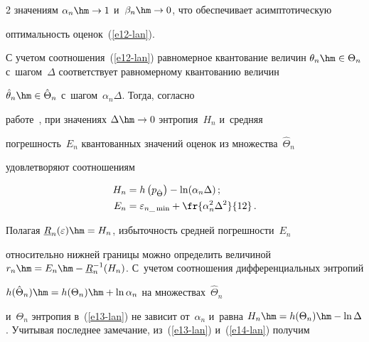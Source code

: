 \begin{multicols}{2}
значениям $\alpha_n\hm\to 1$ и~$\beta_n\hm\to 0$, что обеспечивает асимптотическую 


оптимальность оценок~(\ref{e12-lan}). 





С учетом соотношения~(\ref{e12-lan}) равномерное квантование величин $\theta_n\hm\in 


\Theta_n$ с~шагом~$\Delta$ соответствует равномерному квантованию величин 


$\hat{\theta}_n\hm\in \hat{\Theta}_n$ с~шагом~$\alpha_n\Delta$. Тогда, согласно  


работе~\cite{10-lan}, при значениях $\Delta\hm\to 0$ энтропия~$H_n$ и~средняя 


погрешность~$E_n$ квантованных значений оценок из множества~$\hat{\Theta}_n$ 


удовле\-тво\-ря\-ют соотношениям 





\pagebreak





\noindent


\begin{align}


H_n&= h\left(p_{\hat{\Theta}}\right)-\ln(\alpha_n\Delta)\,;\label{e13-lan}\\


E_n&= \varepsilon_{n\_\min} +\fr{\alpha_n^2\Delta^2}{12}\,.\label{e14-lan}


\end{align}





Полагая $\underline{R}_n(\varepsilon)\hm=H_n$, избыточность средней погрешности~$E_n$ 


относительно нижней границы мож\-но определить величиной $r_n\hm= E_n\hm- 


\underline{R}_n^{-1} (H_n)$. С~учетом соотношения дифференциальных энтропий 


$h(\hat{\Theta}_n) \hm= h(\Theta_n) \hm+ \ln\alpha_n$ на множествах~$\hat{\Theta}_n$ 


и~$\Theta_n$ энтропия в~(\ref{e13-lan}) не зависит от~$\alpha_n$ и~равна $H_n\hm= h(\Theta_n) 


\hm- \ln\Delta$. Учитывая последнее замечание, из~(\ref{e13-lan}) и~(\ref{e14-lan}) получим 


\begin{equation}



\end{equation}
\end{multicols}
